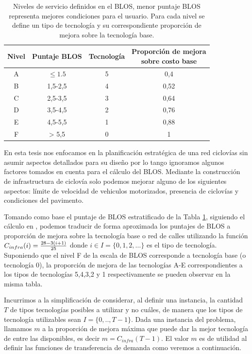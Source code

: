 \documentclass{article}
\begin{document}
  \begin{table}[h!]
    \centering
    \begin{tabular}{cccc}
      \toprule
        Nivel & Puntaje BLOS & Tecnología & \shortstack{Proporción de mejora \\ sobre costo base} \\
      \midrule
        A     & $\leq 1.5$   & 5              & 0,4   \\
        B     & 1,5-2,5      & 4              & 0,52  \\
        C     & 2,5-3,5      & 3              & 0,64  \\
        D     & 3,5-4,5      & 2              & 0,76  \\
        E     & 4,5-5,5      & 1              & 0,88  \\
        F     & > 5,5        & 0              & 1     \\
      \bottomrule
    \end{tabular}
    \caption{Niveles de servicio definidos en el BLOS, menor puntaje BLOS representa mejores condiciones para el usuario. Para cada nivel se define un tipo de tecnología y su correspondiente proporción de mejora sobre la tecnología base.}\label{table:blosscores}
  \end{table}

  En esta tesis nos enfocamos en la planificación estratégica de una red ciclovías sin asumir aspectos detallados para su diseño por lo tango ignoramos algunos factores tomados en cuenta para el cálculo del BLOS. Mediante la construcción de infrastructura de ciclovía solo podemos mejorar alguno de los siguientes aspectos: límite de velocidad de vehiculos motorizados, presencia de ciclovías y condiciones del pavimento.

  Tomando como base el puntaje de BLOS estratificado de la Tabla \ref{table:blosscores}, siguiendo el cálculo en \cite{baya2021}, podemos traducir de forma aproximada los puntajes de BLOS a proporción de mejora sobre la tecnología base o red de calles utilizando la función $C_{infra}(i) = {28 - 3 (i + 1) \over 25}$ donde $i \in I = \{0,1,2,\ldots\}$ es el tipo de tecnología. Suponiendo que el nivel F de la escala de BLOS corresponde a tecnología base (o tecnología 0), la proporción de mejora de las tecnologías A-E correspondientes a los tipos de tecnologías 5,4,3,2 y 1 respectivamente se pueden observar en la misma tabla.

  Incurrimos a la simplificación de considerar, al definir una instancia, la cantidad $T$ de tipos tecnologías posibles a utilizar y no cuáles, de manera que los tipos de tecnología utilizables sean $I = \{0,.., T - 1\}$. Dada una instancia del problema, llamamos $m$ a la proporción de mejora máxima que puede dar la mejor tecnología de entre las disponibles, es decir $m = C_{infra}(T - 1)$. El valor $m$ es de utilidad al definir las funciones de transferencia de demanda como veremos a continuación.
\end{document}
